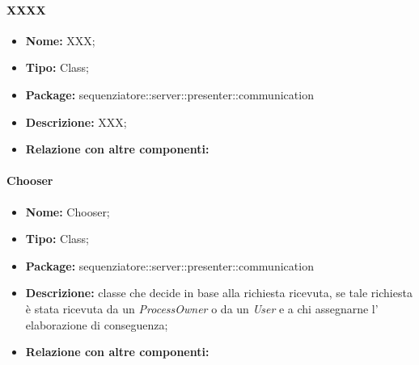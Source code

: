 \paragraph{XXXX}
	\begin{itemize}
		\item \textbf{Nome:} XXX;
		\item \textbf{Tipo:} Class;
		\item \textbf{Package:} sequenziatore::server::presenter::communication
		\item \textbf{Descrizione:} XXX;
		\item \textbf{Relazione con altre componenti:}
	\end{itemize}

\paragraph{Chooser}
	\begin{itemize}
		\item \textbf{Nome:} Chooser;
		\item \textbf{Tipo:} Class;
		\item \textbf{Package:} sequenziatore::server::presenter::communication
		\item \textbf{Descrizione:} classe che decide in base alla richiesta ricevuta, se tale richiesta è stata ricevuta da un \textit{ProcessOwner} o da un \textit{User} e a chi assegnarne l' elaborazione di conseguenza;
		\item \textbf{Relazione con altre componenti:}
	\end{itemize}